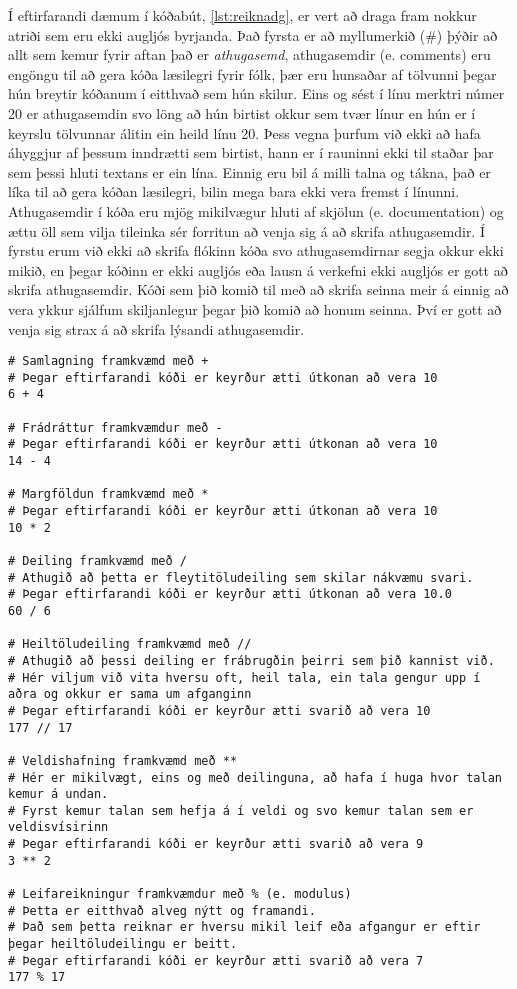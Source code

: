 Í eftirfarandi dæmum í kóðabút, \ref{lst:reiknadg}, er vert að draga fram nokkur atriði sem eru ekki augljós byrjanda. 
Það fyrsta er að myllumerkið (\#) þýðir að allt sem kemur fyrir aftan það er \textit{athugasemd}, athugasemdir (e. comments) eru engöngu til að gera kóða læsilegri fyrir fólk, þær eru hunsaðar af tölvunni þegar hún breytir kóðanum í eitthvað sem hún skilur.
Eins og sést í línu merktri númer 20 er athugasemdin svo löng að hún birtist okkur sem tvær línur en hún er í keyrslu tölvunnar álitin ein heild línu 20.
Þess vegna þurfum við ekki að hafa áhyggjur af þessum inndrætti sem birtist, hann er í rauninni ekki til staðar þar sem þessi hluti textans er ein lína.
Einnig eru bil á milli talna og tákna, það er líka til að gera kóðan læsilegri, bilin mega bara ekki vera fremst í línunni.
Athugasemdir í kóða eru mjög mikilvægur hluti af skjölun (e. documentation) og ættu öll sem vilja tileinka sér forritun að venja sig á að skrifa athugasemdir.
Í fyrstu erum við ekki að skrifa flókinn kóða svo athugasemdirnar segja okkur ekki mikið, en þegar kóðinn er ekki augljós eða lausn á verkefni ekki augljós er gott að skrifa athugasemdir.
Kóði sem þið komið til með að skrifa seinna meir á einnig að vera ykkur sjálfum skiljanlegur þegar þið komið að honum seinna.
Því er gott að venja sig strax á að skrifa lýsandi athugasemdir. 

\begin{lstlisting}[caption=Reikniaðgerðir, label=lst:reiknadg]
# Samlagning framkvæmd með + 
# Þegar eftirfarandi kóði er keyrður ætti útkonan að vera 10
6 + 4 

# Frádráttur framkvæmdur með -
# Þegar eftirfarandi kóði er keyrður ætti útkonan að vera 10
14 - 4 

# Margföldun framkvæmd með * 
# Þegar eftirfarandi kóði er keyrður ætti útkonan að vera 10
10 * 2 

# Deiling framkvæmd með / 
# Athugið að þetta er fleytitöludeiling sem skilar nákvæmu svari.
# Þegar eftirfarandi kóði er keyrður ætti útkonan að vera 10.0
60 / 6 

# Heiltöludeiling framkvæmd með //
# Athugið að þessi deiling er frábrugðin þeirri sem þið kannist við.
# Hér viljum við vita hversu oft, heil tala, ein tala gengur upp í aðra og okkur er sama um afganginn
# Þegar eftirfarandi kóði er keyrður ætti svarið að vera 10
177 // 17

# Veldishafning framkvæmd með **
# Hér er mikilvægt, eins og með deilinguna, að hafa í huga hvor talan kemur á undan.
# Fyrst kemur talan sem hefja á í veldi og svo kemur talan sem er veldisvísirinn
# Þegar eftirfarandi kóði er keyrður ætti svarið að vera 9
3 ** 2

# Leifareikningur framkvæmdur með % (e. modulus)
# Þetta er eitthvað alveg nýtt og framandi.
# Það sem þetta reiknar er hversu mikil leif eða afgangur er eftir þegar heiltöludeilingu er beitt.
# Þegar eftirfarandi kóði er keyrður ætti svarið að vera 7
177 % 17

\end{lstlisting}

